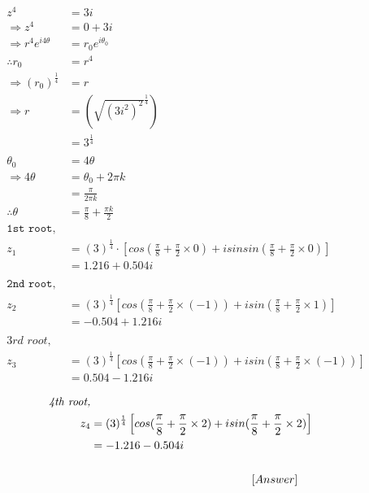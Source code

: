 \documentclass[12pt]{article}
\begin{document}
\begin{align*}
    z^4 &= 3i
    \\
    \Rightarrow z^4 &= 0 + 3i
    \\
    \Rightarrow r^4 e^{i4\theta} &= r_0 e^{i \theta_0}
    \\
    \therefore r_0 &= r^4
    \\
    \Rightarrow (r_0)^{\frac{1}{4}} &= r
    \\
    \Rightarrow r &= \left(\sqrt{(3i^2)^2}^{\frac{1}{4}}\right)
    \\
    &= 3^{\frac{1}{4}}
    \\
    \\
    \theta_0 &= 4\theta
    \\
    \Rightarrow 4\theta &= \theta_0 + 2 \pi k
    \\
    &= \frac{\pi}{2\pi k}
    \\
    \therefore \theta &= \frac{\pi}{8} + \frac{\pi k}{2}
    \\
    \texttt{1st root,}
    \\
    z_1 &= (3)^{\frac{1}{4}} \cdot \left[cos(\frac{\pi}{8} + \frac{\pi}{2} \times 0) + isin sin(\frac{\pi}{8} + \frac{\pi}{2} \times 0) \right]
    \\
    &= 1.216 + 0.504 i
    \\
    \\
    \texttt{2nd root,}
    \\
    z_2 &= (3)^{\frac{1}{4}} \left[cos(\frac{\pi}{8} + \frac{\pi}{2} \times (-1)) + i sin(\frac{\pi}{8} + \frac{\pi}{2} \times 1)
    \right]
    \\
    &= -0.504 + 1.216 i
    \\ \\
    \textit{3rd root,}
    \\
    z_3 &= (3)^{\frac{1}{4}} \left[cos(\frac{\pi}{8} + \frac{\pi}{2} \times (-1)) + i sin(\frac{\pi}{8} + \frac{\pi}{2} \times (-1))\right]
    \\
    &= 0.504 - 1.216 i
\end{align*}

\newpage
\begin{align*}
    \textit{4th root,}
    \\
    z_4 &= (3)^{\frac{1}{4}} \left[cos(\frac{\pi}{8} + \frac{\pi}{2} \times 2) + i sin(\frac{\pi}{8} + \frac{\pi}{2} \times 2)
    \right]
    \\
    &= -1.216 - 0.504 i
    \\
    \\
    &\hspace{50mm}[Answer]
\end{align*}
    
\end{document}
